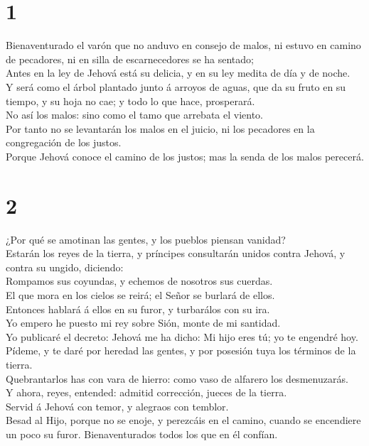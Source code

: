 \hypertarget{section}{%
\section{1}\label{section}}

 Bienaventurado el varón que no anduvo en consejo de malos,
ni estuvo en camino de pecadores, ni en silla de escarnecedores se ha
sentado;\\
 Antes en la ley de Jehová está su delicia, y en su ley
medita de día y de noche.\\
 Y será como el árbol plantado junto á arroyos de aguas, que
da su fruto en su tiempo, y su hoja no cae; y todo lo que hace,
prosperará.\\
 No así los malos: sino como el tamo que arrebata el
viento.\\
 Por tanto no se levantarán los malos en el juicio, ni los
pecadores en la congregación de los justos.\\
 Porque Jehová conoce el camino de los justos; mas la senda
de los malos perecerá.

\hypertarget{section-1}{%
\section{2}\label{section-1}}

 ¿Por qué se amotinan las gentes, y los pueblos piensan
vanidad?\\
 Estarán los reyes de la tierra, y príncipes consultarán
unidos contra Jehová, y contra su ungido, diciendo:\\
 Rompamos sus coyundas, y echemos de nosotros sus cuerdas.\\
 El que mora en los cielos se reirá; el Señor se burlará de
ellos.\\
 Entonces hablará á ellos en su furor, y turbarálos con su
ira.\\
 Yo empero he puesto mi rey sobre Sión, monte de mi
santidad.\\
 Yo publicaré el decreto: Jehová me ha dicho: Mi hijo eres
tú; yo te engendré hoy.\\
 Pídeme, y te daré por heredad las gentes, y por posesión
tuya los términos de la tierra.\\
 Quebrantarlos has con vara de hierro: como vaso de alfarero
los desmenuzarás.\\
 Y ahora, reyes, entended: admitid corrección, jueces de la
tierra.\\
 Servid á Jehová con temor, y alegraos con temblor.\\
 Besad al Hijo, porque no se enoje, y perezcáis en el
camino, cuando se encendiere un poco su furor. Bienaventurados todos los
que en él confían.

